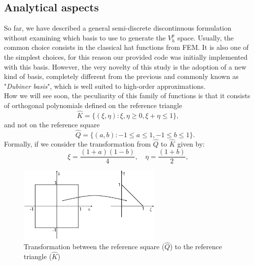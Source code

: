 \documentclass[a4paper,11pt]{article}
\begin{document}
    \subsection{Analytical aspects}\label{analytical_aspects}
    So far, we have described a general semi-discrete discontinuous formulation without examining which basis to use to generate the $V_h^p$ space. Usually, the common choice consists in the classical hat functions from FEM. It is also one of the simplest choices, for this reason our provided code was initially implemented with this basis. However, the very novelty of this study is the adoption of a new kind of basis, completely different from the previous and commonly known as "\emph{Dubiner basis}"\cite{dubiner}, which is well suited to high-order approximations. \\
    How we will see soon, the peculiarity of this family of functions is that it consists of orthogonal polynomials defined on the reference triangle
    \begin{equation*}
    \hat{K}=\{ (\xi, \eta) : \xi, \eta \ge 0,	\xi+\eta \le 1 \},
    \end{equation*}
    and not on the reference square
    \begin{equation*}
    \quad \quad \hat{Q}=\{ (a, b) : -1 \le a \le 1, -1 \le b \le 1 \}.
    \end{equation*}
    Formally, if we consider the transformation from $\hat{Q}$ to $\hat{K}$ given by:
    \begin{equation}\label{transformation_formula}
    \xi=\frac{(1+a)(1-b)}{4},  \quad \eta=\frac{(1+b)}{2},
    \end{equation}
    
    \begin{figure}[h]
    \begin{center}
    \includegraphics[width = 7cm]{./transformation.png}
    	\caption{Transformation between the reference square ($\hat{Q}$) to the reference triangle ($\hat{K}$)}
    	\label{transformation}
    \end{center}
    \end{figure}
    
\end{document}
